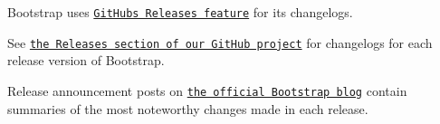 Bootstrap uses \href{https://github.com/blog/1547-release-your-software}{\tt Git\+Hub\textquotesingle{}s Releases feature} for its changelogs.

See \href{https://github.com/twbs/bootstrap/releases}{\tt the Releases section of our Git\+Hub project} for changelogs for each release version of Bootstrap.

Release announcement posts on \href{http://blog.getbootstrap.com}{\tt the official Bootstrap blog} contain summaries of the most noteworthy changes made in each release. 